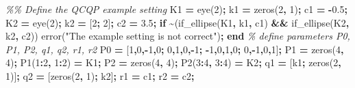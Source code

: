 \documentclass[
]{book}
\newenvironment{Shaded}{\begin{snugshade}}{\end{snugshade}}
\newcommand{\CommentTok}[1]{\textcolor[rgb]{0.56,0.35,0.01}{\textit{#1}}}
\newcommand{\FloatTok}[1]{\textcolor[rgb]{0.00,0.00,0.81}{#1}}
\newcommand{\KeywordTok}[1]{\textcolor[rgb]{0.13,0.29,0.53}{\textbf{#1}}}
\newcommand{\NormalTok}[1]{#1}
\newcommand{\OperatorTok}[1]{\textcolor[rgb]{0.81,0.36,0.00}{\textbf{#1}}}
\newcommand{\StringTok}[1]{\textcolor[rgb]{0.31,0.60,0.02}{#1}}
\newcommand{\VariableTok}[1]{\textcolor[rgb]{0.00,0.00,0.00}{#1}}
\theoremstyle{definition}
\theoremstyle{definition}
\theoremstyle{definition}
\theoremstyle{definition}
\theoremstyle{remark}
\begin{document}
\begin{Shaded}
\begin{Highlighting}[]
\CommentTok{\%\% Define the QCQP example setting}
\VariableTok{K1} \OperatorTok{=} \VariableTok{eye}\NormalTok{(}\FloatTok{2}\NormalTok{)}\OperatorTok{;}
\VariableTok{k1} \OperatorTok{=} \VariableTok{zeros}\NormalTok{(}\FloatTok{2}\OperatorTok{,} \FloatTok{1}\NormalTok{)}\OperatorTok{;}
\VariableTok{c1} \OperatorTok{=} \OperatorTok{{-}}\FloatTok{0.5}\OperatorTok{;}
\VariableTok{K2} \OperatorTok{=} \VariableTok{eye}\NormalTok{(}\FloatTok{2}\NormalTok{)}\OperatorTok{;}
\VariableTok{k2} \OperatorTok{=}\NormalTok{ [}\FloatTok{2}\OperatorTok{;} \FloatTok{2}\NormalTok{]}\OperatorTok{;}
\VariableTok{c2} \OperatorTok{=} \FloatTok{3.5}\OperatorTok{;}
\KeywordTok{if} \OperatorTok{\textasciitilde{}}\NormalTok{(}\VariableTok{if\_ellipse}\NormalTok{(}\VariableTok{K1}\OperatorTok{,} \VariableTok{k1}\OperatorTok{,} \VariableTok{c1}\NormalTok{) }\OperatorTok{\&\&} \VariableTok{if\_ellipse}\NormalTok{(}\VariableTok{K2}\OperatorTok{,} \VariableTok{k2}\OperatorTok{,} \VariableTok{c2}\NormalTok{))}
    \VariableTok{error}\NormalTok{(}\StringTok{"The example setting is not correct"}\NormalTok{)}\OperatorTok{;}
\KeywordTok{end}
\CommentTok{\% define parameters P0, P1, P2, q1, q2, r1, r2}
\VariableTok{P0} \OperatorTok{=}\NormalTok{ [}\FloatTok{1}\OperatorTok{,}\FloatTok{0}\OperatorTok{,{-}}\FloatTok{1}\OperatorTok{,}\FloatTok{0}\OperatorTok{;} \FloatTok{0}\OperatorTok{,}\FloatTok{1}\OperatorTok{,}\FloatTok{0}\OperatorTok{,{-}}\FloatTok{1}\OperatorTok{;} \OperatorTok{{-}}\FloatTok{1}\OperatorTok{,}\FloatTok{0}\OperatorTok{,}\FloatTok{1}\OperatorTok{,}\FloatTok{0}\OperatorTok{;} \FloatTok{0}\OperatorTok{,{-}}\FloatTok{1}\OperatorTok{,}\FloatTok{0}\OperatorTok{,}\FloatTok{1}\NormalTok{]}\OperatorTok{;}
\VariableTok{P1} \OperatorTok{=} \VariableTok{zeros}\NormalTok{(}\FloatTok{4}\OperatorTok{,} \FloatTok{4}\NormalTok{)}\OperatorTok{;}
\VariableTok{P1}\NormalTok{(}\FloatTok{1}\OperatorTok{:}\FloatTok{2}\OperatorTok{,} \FloatTok{1}\OperatorTok{:}\FloatTok{2}\NormalTok{) }\OperatorTok{=} \VariableTok{K1}\OperatorTok{;}
\VariableTok{P2} \OperatorTok{=} \VariableTok{zeros}\NormalTok{(}\FloatTok{4}\OperatorTok{,} \FloatTok{4}\NormalTok{)}\OperatorTok{;}
\VariableTok{P2}\NormalTok{(}\FloatTok{3}\OperatorTok{:}\FloatTok{4}\OperatorTok{,} \FloatTok{3}\OperatorTok{:}\FloatTok{4}\NormalTok{) }\OperatorTok{=} \VariableTok{K2}\OperatorTok{;}
\VariableTok{q1} \OperatorTok{=}\NormalTok{ [}\VariableTok{k1}\OperatorTok{;} \VariableTok{zeros}\NormalTok{(}\FloatTok{2}\OperatorTok{,} \FloatTok{1}\NormalTok{)]}\OperatorTok{;}
\VariableTok{q2} \OperatorTok{=}\NormalTok{ [}\VariableTok{zeros}\NormalTok{(}\FloatTok{2}\OperatorTok{,} \FloatTok{1}\NormalTok{)}\OperatorTok{;} \VariableTok{k2}\NormalTok{]}\OperatorTok{;}
\VariableTok{r1} \OperatorTok{=} \VariableTok{c1}\OperatorTok{;}
\VariableTok{r2} \OperatorTok{=} \VariableTok{c2}\OperatorTok{;}


\end{Highlighting}
\end{Shaded}
\end{document}

